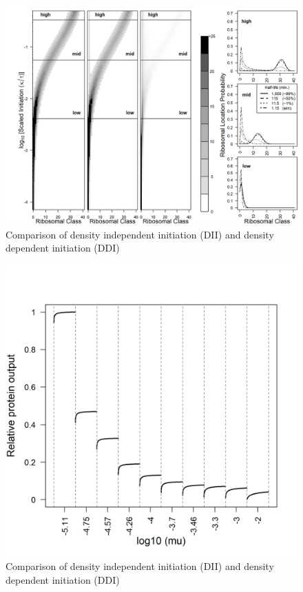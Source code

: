 \documentclass[review]{elsarticle}
\begin{document}
\begin{figure}[ht]
\centering
\includegraphics[width=\textwidth]{Images/2022-10-21_Figure2_Marking_Rate_range_medianlength.png}
\caption{Comparison of density independent initiation (DII) and density dependent initiation (DDI)}
\end{figure}


\begin{figure}[ht]
\centering
\includegraphics[width=\textwidth/2]{Images/Protein_production.png}
\caption{Comparison of density independent initiation (DII) and density dependent initiation (DDI)}
\end{figure}
\end{document}
